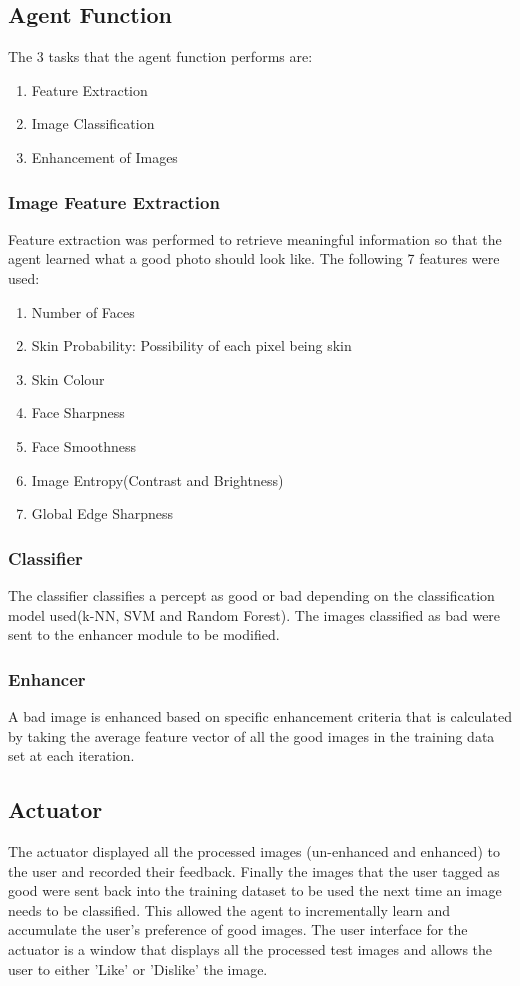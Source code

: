 \subsection{Agent Function}
The 3 tasks that the agent function performs are:
\begin{enumerate}
	\item Feature Extraction
	\item Image Classification
	\item Enhancement of Images
\end{enumerate}

\subsubsection{Image Feature Extraction}
Feature extraction was performed to retrieve meaningful information so that the agent learned what a good photo should look like. The following 7 features were used:
\begin{enumerate}
  \item Number of Faces
  \item Skin Probability: Possibility of each pixel being skin
  \item Skin Colour
  \item Face Sharpness
  \item Face Smoothness
   \item Image Entropy(Contrast and Brightness)
  \item Global Edge Sharpness
 \end{enumerate}

\subsubsection{Classifier}
The classifier classifies a percept as good or bad depending on the classification model used(k-NN, SVM and Random Forest). The images classified as bad were sent to the enhancer module to be modified.
\subsubsection{Enhancer}
A bad image is enhanced based on specific enhancement criteria that is calculated by taking the average feature vector of all the good images in the training data set at each iteration.
\subsection{Actuator}
The actuator displayed all the processed images (un-enhanced and enhanced) to the user and recorded their feedback. Finally the images that the user tagged as good were sent back into the training dataset to be used the next time an image needs to be classified. This allowed the agent to incrementally learn and accumulate the user's preference of good images.
The user interface for the actuator is a window that displays all the processed test images and allows the user to either 'Like' or 'Dislike' the image.
